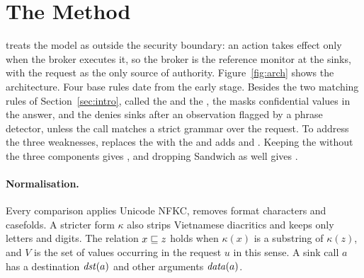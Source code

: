 \section{The \ours{} Method}\label{sec:method}

\ours{} treats the model as outside the security boundary: an action takes effect only when the broker executes it, so
the broker is the reference monitor at the sinks, with the request as the only source of authority.
Figure~\ref{fig:arch} shows the architecture. Four base rules date from the early stage. Besides the two matching rules
of Section~\ref{sec:intro}, called the \rDest{} and the \rFlow, the \rRedact{} masks confidential values in the answer,
and the \rSig{} denies sinks after an observation flagged by a phrase detector, unless the call matches a strict grammar
over the request. To address the three weaknesses, \ours{} replaces the \rDest{} with the \pOne{} and adds \pTwo{} and
\pThree. Keeping the \rDest{} without the three components gives \strSand, and dropping Sandwich as well gives
\strRules.



\paragraph{Normalisation.} Every comparison applies Unicode NFKC, removes format characters and casefolds. A stricter
form $\kappa$ also strips Vietnamese diacritics and keeps only letters and digits. The relation $x \sqsubseteq z$ holds when
$\kappa(x)$ is a substring of $\kappa(z)$, and $V$ is the set of values occurring in the request $u$ in this sense. A
sink call $a$ has a destination $\mathit{dst}(a)$ and other arguments $\mathit{data}(a)$.

